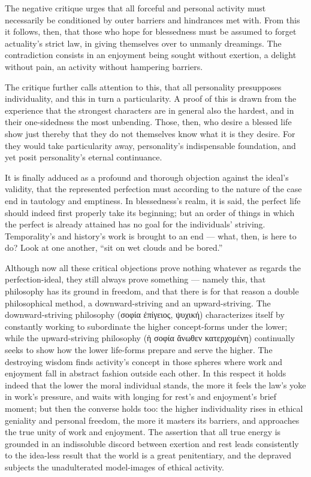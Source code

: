 \documentclass[12pt]{book}
\begin{document}
The negative critique urges that all forceful and personal activity must
necessarily be conditioned by outer barriers and hindrances met with. From
this it follows, then, that those who hope for blessedness must be assumed
to forget actuality's strict law, in giving themselves over to unmanly
dreamings. The contradiction consists in an enjoyment being sought without
exertion, a delight without pain, an activity without hampering barriers.

The critique further calls attention to this, that all personality
presupposes individuality, and this in turn a particularity. A proof of this
is drawn from the experience that the strongest characters are in general
also the hardest, and in their one-sidedness the most unbending. Those,
then, who desire a blessed life show just thereby that they do not
themselves know what it is they desire. For they would take particularity
away, personality's indispensable foundation, and yet posit personality's
eternal continuance.

It is finally adduced as a profound and thorough objection against the
ideal's validity, that the represented perfection must according to the
nature of the case end in tautology and emptiness. In blessedness's realm,
it is said, the perfect life should indeed first properly take its
beginning; but an order of things in which the perfect is already attained
has no goal for the individuals' striving. Temporality's and history's work
is brought to an end --- what, then, is here to do? Look at one another,
``sit on wet clouds and be bored.''

Although now all these critical objections prove nothing whatever as regards
the perfection-ideal, they still always prove something --- namely this,
that philosophy has its ground in freedom, and that there is for that reason
a double philosophical method, a downward-striving and an upward-striving.
The downward-striving philosophy (σοφία ἐπίγειος, ψυχική) characterizes
itself by constantly working to subordinate the higher concept-forms under
the lower; while the upward-striving philosophy (ἡ σοφία ἄνωθεν
κατερχομένη) continually seeks to show how the lower life-forms prepare and
serve the higher. The destroying wisdom finds activity's concept in those
spheres where work and enjoyment fall in abstract fashion outside each
other. In this respect it holds indeed that the lower the moral individual
stands, the more it feels the law's yoke in work's pressure, and waits with
longing for rest's and enjoyment's brief moment; but then the converse holds
too: the higher individuality rises in ethical geniality and personal
freedom, the more it masters its barriers, and approaches the true unity of
work and enjoyment. The assertion that all true energy is grounded in an
indissoluble discord between exertion and rest leads consistently to the
idea-less result that the world is a great penitentiary, and the depraved
subjects the unadulterated model-images of ethical activity.
\end{document}
